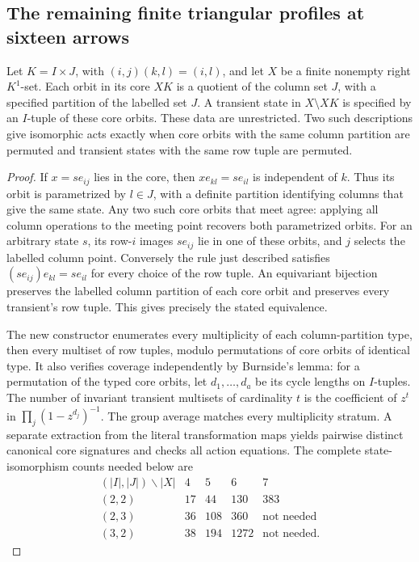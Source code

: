 \subsection{The remaining finite triangular profiles at sixteen arrows}

\begin{lemma}
\label{CP2:A-rectangular-band-act-normal-forms}
Let $K=I\times J$, with $(i,j)(k,l)=(i,l)$, and let $X$ be
a finite nonempty right $K^1$-set. Each orbit in its core $XK$
is a quotient of the column set $J$, with a specified partition
of the labelled set $J$. A transient state in $X\setminus XK$
is specified by an $I$-tuple of these core orbits. These data
are unrestricted. Two such descriptions give isomorphic acts
exactly when core orbits with the same column partition are
permuted and transient states with the same row tuple are
permuted.
\end{lemma}
\begin{proof}
If $x=se_{ij}$ lies in the core, then
$xe_{kl}=se_{il}$ is independent of $k$. Thus its orbit is
parametrized by $l\in J$, with a definite partition identifying
columns that give the same state. Any two such core orbits
that meet agree: applying all column operations to the meeting
point recovers both parametrized orbits. For an arbitrary state
$s$, its row-$i$ images $se_{ij}$ lie in one of these orbits,
and $j$ selects the labelled column point. Conversely the rule
just described satisfies
$(se_{ij})e_{kl}=se_{il}$ for every choice of the row tuple.
An equivariant bijection preserves the labelled column
partition of each core orbit and preserves every transient's
row tuple. This gives precisely the stated equivalence.

The new constructor 
enumerates every multiplicity of each column-partition type,
then every multiset of row tuples, modulo permutations of core
orbits of identical type. It also verifies coverage independently
by Burnside's lemma: for a permutation of the typed core orbits,
let $d_1,\ldots,d_a$ be its cycle lengths on $I$-tuples. The
number of invariant transient multisets of cardinality $t$ is
the coefficient of $z^t$ in
$\prod_j(1-z^{d_j})^{-1}$. The group average matches every
multiplicity stratum. A separate extraction from the literal
transformation maps yields pairwise distinct canonical core
signatures and checks all action equations.
The complete state-isomorphism counts needed below are
\[
\begin{array}{c|rrrr}
(|I|,|J|)\backslash |X|&4&5&6&7\\\hline
(2,2)&17&44&130&383\\
(2,3)&36&108&360&\text{not needed}\\
(3,2)&38&194&1272&\text{not needed}.
\end{array}
\]
\end{proof}

